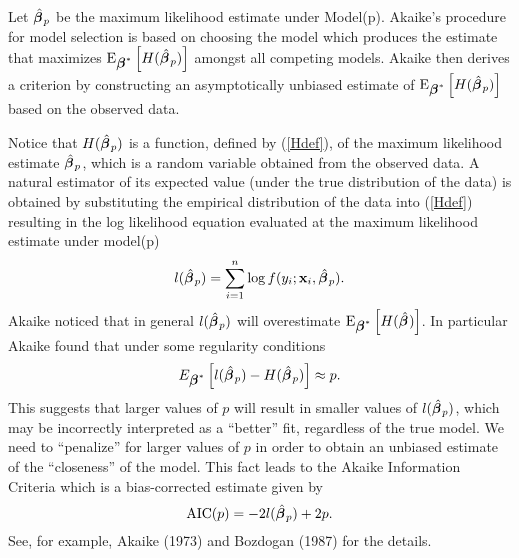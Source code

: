 Let $\hat{\mbox{\boldmath $\beta$\unboldmath}\:}\!_p$ be the maximum likelihood estimate under
Model(p). Akaike's procedure for model selection is based on choosing
the model which produces the estimate that maximizes 
$\mbox{E}_{\mbox{\boldmath $\beta$\unboldmath}^*}\left[H(\hat{\mbox{\boldmath $\beta$\unboldmath}\:}\!_p)\right]$ amongst all
competing models. Akaike then derives a criterion by constructing an
asymptotically unbiased estimate of $\mbox{E}_{\mbox{\boldmath $\beta$\unboldmath}^*}\left[H(\hat{\mbox{\boldmath $\beta$\unboldmath}\:}\!_p)\right]$ based
on the observed data. 

Notice that $H(\hat{\mbox{\boldmath $\beta$\unboldmath}\:}\!_p)$ is a function,
defined by (\ref{Hdef}),
of the maximum likelihood estimate $\hat{\mbox{\boldmath $\beta$\unboldmath}\:}\!_p$, which is a
random variable obtained from the observed data.
A natural estimator of 
its expected value (under the true distribution of the data) is
obtained by substituting the empirical distribution of the data into
(\ref{Hdef}) 
resulting in the log likelihood equation evaluated at the maximum
likelihood estimate under model(p)
\[
l(\hat{\mbox{\boldmath $\beta$\unboldmath}\:}\!_p) = \sum_{i=1}^n \log f(y_i;{\mathbf x}_i,\hat{\mbox{\boldmath $\beta$\unboldmath}\:}\!_p).
\]
Akaike noticed that in general  $l(\hat{\mbox{\boldmath $\beta$\unboldmath}\:}\!_p)$ will 
overestimate $\mbox{E}_{\mbox{\boldmath $\beta$\unboldmath}^*}\left[H(\hat{\mbox{\boldmath $\beta$\unboldmath}\:}\!)\right]$.  In particular Akaike found
that under some regularity conditions
\[
E_{\mbox{\boldmath $\beta$\unboldmath}^*}\left[l(\hat{\mbox{\boldmath $\beta$\unboldmath}\:}\!_p) - H(\hat{\mbox{\boldmath $\beta$\unboldmath}\:}\!_p)\right] \approx p .
\]
This suggests that larger 
values of $p$ will result in smaller values 
of $l(\hat{\mbox{\boldmath $\beta$\unboldmath}\:}\!_p)$, which may be
incorrectly interpreted as a ``better'' 
fit, regardless of the true model. We need to ``penalize'' for larger
values of $p$ in order to obtain an unbiased estimate of
the ``closeness'' of the model. 
This fact leads to the Akaike Information Criteria which is a
bias-corrected estimate given by 
\begin{equation}
\label{AIC}
\mbox{AIC}(p) = - 2 l(\hat{\mbox{\boldmath $\beta$\unboldmath}\:}\!_{p}) + 2p .
\end{equation}
See, for example, Akaike (1973) and Bozdogan (1987)  for
the details.  


